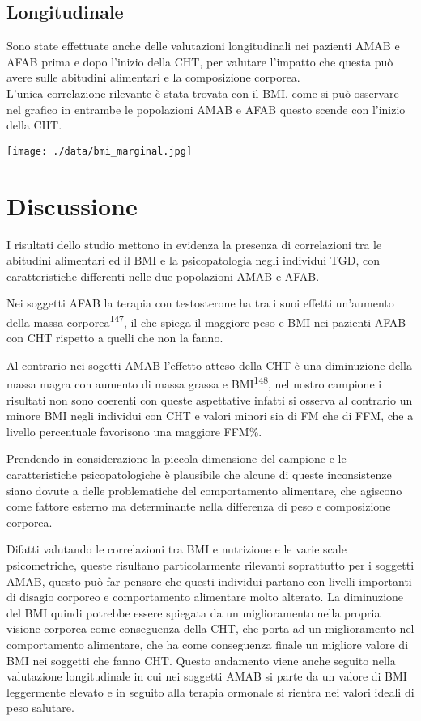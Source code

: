 \documentclass[12pt]{article}
\makeatletter
\newcommand{\cslcitation}[2]
 {\protect\hyper@linkstart{cite}{citeproc_bib_item_#1}#2\hyper@linkend}
\makeatother
\begin{document}
\subsection{Longitudinale}
\label{sec:org4042376}
Sono state effettuate anche delle valutazioni longitudinali nei pazienti AMAB e AFAB prima e dopo l'inizio della CHT, per valutare l'impatto che questa può avere sulle abitudini alimentari e la composizione corporea. \\
L'unica correlazione rilevante è stata trovata con il BMI, come si può osservare nel grafico in entrambe le popolazioni AMAB e AFAB questo scende con l'inizio della CHT.
\begin{center}
\texttt{[image: ./data/bmi\_marginal.jpg]}
\end{center}
\section{Discussione}
\label{sec:orgf7b4b1c}
I risultati dello studio mettono in evidenza la presenza di correlazioni tra le abitudini alimentari ed il BMI e la psicopatologia negli individui TGD, con caratteristiche differenti nelle due popolazioni AMAB e AFAB.

Nei soggetti AFAB la terapia con testosterone ha tra i suoi effetti un'aumento della massa corporea\textsuperscript{\cslcitation{147}{147}}, il che spiega il maggiore peso e BMI nei pazienti AFAB con CHT rispetto a quelli che non la fanno.

Al contrario nei sogetti AMAB l'effetto atteso della CHT è una diminuzione della massa magra con aumento di massa grassa e BMI\textsuperscript{\cslcitation{148}{148}}, nel nostro campione i risultati non sono coerenti con queste aspettative infatti si osserva al contrario un minore BMI negli individui con CHT e valori minori sia di FM che di FFM, che a livello percentuale favorisono una maggiore FFM\%.

Prendendo in considerazione la piccola dimensione del campione e le caratteristiche psicopatologiche è plausibile che alcune di queste inconsistenze siano dovute a delle problematiche del comportamento alimentare, che agiscono come fattore esterno ma determinante nella differenza di peso e composizione corporea.

Difatti valutando le correlazioni tra BMI e nutrizione e le varie scale psicometriche, queste risultano particolarmente rilevanti soprattutto per i soggetti AMAB, questo può far pensare che questi individui partano con livelli importanti di disagio corporeo e comportamento alimentare molto alterato. La diminuzione del BMI quindi potrebbe essere spiegata da un miglioramento nella propria visione corporea come conseguenza della CHT, che porta ad un miglioramento nel comportamento alimentare, che ha come conseguenza finale un migliore valore di BMI nei soggetti che fanno CHT.
Questo andamento viene anche seguito nella valutazione longitudinale in cui nei soggetti AMAB si parte da un valore di BMI leggermente elevato e in seguito alla terapia ormonale si rientra nei valori ideali di peso salutare.
\end{document}

